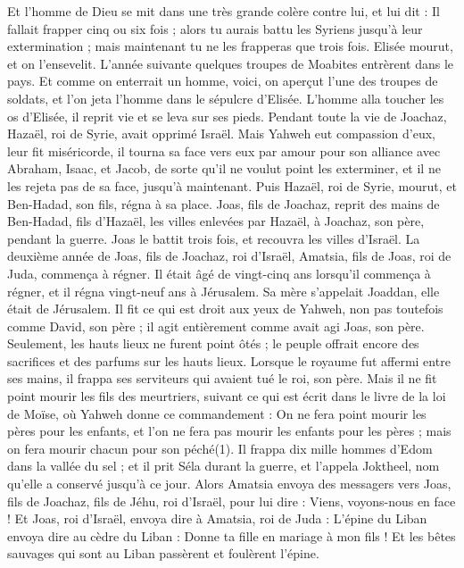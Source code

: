 \begin{multicols}{2}
Et l’homme de Dieu se mit dans une très grande colère contre lui, et lui dit : Il fallait frapper cinq ou six fois ; alors tu aurais battu les Syriens jusqu’à leur extermination ; mais maintenant tu ne les frapperas que trois fois.
Elisée mourut, et on l’ensevelit. L’année suivante quelques troupes de Moabites entrèrent dans le pays.
Et comme on enterrait un homme, voici, on aperçut l’une des troupes de soldats, et l’on jeta l’homme dans le sépulcre d’Elisée. L’homme alla toucher les os d’Elisée, il reprit vie et se leva sur ses pieds.
Pendant toute la vie de Joachaz, Hazaël, roi de Syrie, avait opprimé Israël.
Mais Yahweh eut compassion d’eux, leur fit miséricorde, il tourna sa face vers eux par amour pour son alliance avec Abraham, Isaac, et Jacob, de sorte qu’il ne voulut point les exterminer, et il ne les rejeta pas de sa face, jusqu’à maintenant.
Puis Hazaël, roi de Syrie, mourut, et Ben-Hadad, son fils, régna à sa place.
Joas, fils de Joachaz, reprit des mains de Ben-Hadad, fils d’Hazaël, les villes enlevées par Hazaël, à Joachaz, son père, pendant la guerre. Joas le battit trois fois, et recouvra les villes d’Israël.
\VerseOne{}La deuxième année de Joas, fils de Joachaz, roi d’Israël, Amatsia, fils de Joas, roi de Juda, commença à régner.
Il était âgé de vingt-cinq ans lorsqu’il commença à régner, et il régna vingt-neuf ans à Jérusalem. Sa mère s’appelait Joaddan, elle était de Jérusalem.
Il fit ce qui est droit aux yeux de Yahweh, non pas toutefois comme David, son père ; il agit entièrement comme avait agi Joas, son père.
Seulement, les hauts lieux ne furent point ôtés ; le peuple offrait encore des sacrifices et des parfums sur les hauts lieux.
Lorsque le royaume fut affermi entre ses mains, il frappa ses serviteurs qui avaient tué le roi, son père.
Mais il ne fit point mourir les fils des meurtriers, suivant ce qui est écrit dans le livre de la loi de Moïse, où Yahweh donne ce commandement : On ne fera point mourir les pères pour les enfants, et l’on ne fera pas mourir les enfants pour les pères ; mais on fera mourir chacun pour son péché(1).
Il frappa dix mille hommes d’Edom dans la vallée du sel ; et il prit Séla durant la guerre, et l’appela Joktheel, nom qu’elle a conservé jusqu’à ce jour.
Alors Amatsia envoya des messagers vers Joas, fils de Joachaz, fils de Jéhu, roi d’Israël, pour lui dire : Viens, voyons-nous en face !
Et Joas, roi d’Israël, envoya dire à Amatsia, roi de Juda : L’épine du Liban envoya dire au cèdre du Liban : Donne ta fille en mariage à mon fils ! Et les bêtes sauvages qui sont au Liban passèrent et foulèrent l’épine.

\end{multicols}
